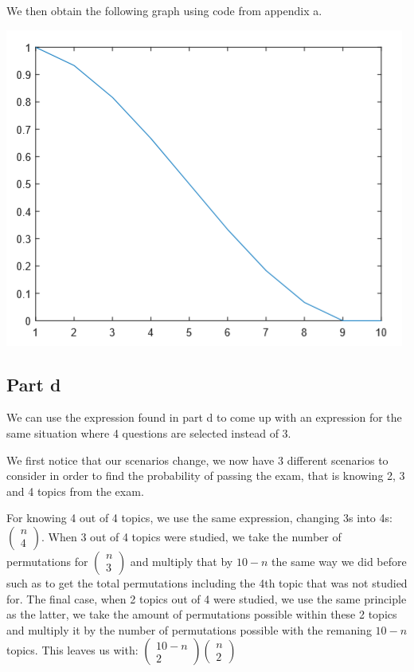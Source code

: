 \documentclass[14.5pt]{article}
\begin{document}
We then obtain the following graph using code from appendix a.
\begin{center}
    \includegraphics[scale=0.5]{p1}
\end{center}


\subsection*{Part d}
We can use the expression found in part d to come up with an expression for the same situation
where 4 questions are selected instead of 3.

We first notice that our scenarios change, we now have 3 different scenarios to consider in order
to find the probability of passing the exam, that is knowing 2, 3 and 4 topics from the exam.

For knowing 4 out of 4 topics, we use the same expression, changing 3s into 4s:
$\begin{pmatrix} n \\ 4 \end{pmatrix}$.
When 3 out of 4 topics were studied, we take the number of permutations for
$\begin{pmatrix} n \\ 3 \end{pmatrix}$ and multiply that by $10 - n $ the same way we did before
such as to get the total permutations including the 4th topic that was not studied for.
The final case, when 2 topics out of 4 were studied, we use the same principle as the latter, we
take the amount of permutations possible within these 2 topics and multiply it by the number
of permutations possible with the remaning $ 10 - n $ topics. This leaves us with:
$\begin{pmatrix} 10 - n \\ 2 \end{pmatrix}\begin{pmatrix} n \\ 2 \end{pmatrix}$
\end{document}
